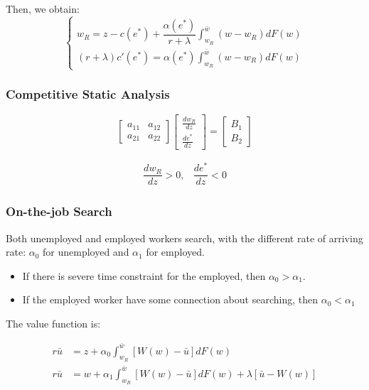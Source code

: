 \documentclass[dvipdfmx, 12pt]{article}
\begin{document}
Then, we obtain:
\[
\begin{cases}
  w_R = z - c(e^*) + \dfrac{\alpha (e^*)}{r + \lambda} \int_{w_R}^{\bar{w}} (w - w_R) d F(w) \\
  (r + \lambda)c'(e^*) = \alpha(e^*) \int_{w_R}^{\bar{w}} (w - w_R) dF(w)
\end{cases}
\]

\subsubsection{Competitive Static Analysis}

\[
\begin{bmatrix}
  a_{11} & a_{12} \\ a_{21} & a_{22}
\end{bmatrix}
\begin{bmatrix}
  \frac{d w_R}{d z} \\ \frac{d e^*}{dz}
\end{bmatrix}
= \begin{bmatrix}
  B_1 \\ B_2
\end{bmatrix}
\]

\begin{align*}
  \dfrac{d w_R}{d z} > 0, &\dfrac{d e^*}{dz} < 0
\end{align*}

\subsubsection{On-the-job Search}

Both unemployed and employed workers search, with the different rate of arriving rate: $\alpha_0$ for unemployed and $\alpha_1$ for employed.

\begin{itemize}
  \item If there is severe time constraint for the employed, then $\alpha_0 > \alpha_1$.

  \item If the employed worker have some connection about searching, then $\alpha_0 < \alpha_1$
\end{itemize}

The value function is:

\begin{align*}
  r \bar{u} &= z + \alpha_0 \int_{w_R}^{\bar{w}} [W(w)- \bar{u}] dF(w) \\
  r \bar{u} &= w + \alpha_1 \int_{w_R}^{\bar{w}} [W(w)- \bar{u}] dF(w) + \lambda [\bar{u} - W(w)]
\end{align*}
\end{document}

